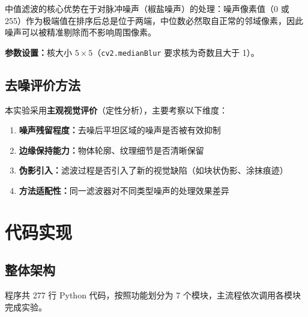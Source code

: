 \documentclass[12pt,a4paper]{ctexart}
\begin{document}
中值滤波的核心优势在于对脉冲噪声（椒盐噪声）的处理：噪声像素值（0 或 255）作为极端值在排序后总是位于两端，中位数必然取自正常的邻域像素，因此噪声可以被精准剔除而不影响周围像素。

\textbf{参数设置：}核大小 $5\times5$（\texttt{cv2.medianBlur} 要求核为奇数且大于 1）。

\subsection{去噪评价方法}

本实验采用\textbf{主观视觉评价}（定性分析），主要考察以下维度：

\begin{enumerate}[leftmargin=*]
    \item \textbf{噪声残留程度：}去噪后平坦区域的噪声是否被有效抑制
    \item \textbf{边缘保持能力：}物体轮廓、纹理细节是否清晰保留
    \item \textbf{伪影引入：}滤波过程是否引入了新的视觉缺陷（如块状伪影、涂抹痕迹）
    \item \textbf{方法适配性：}同一滤波器对不同类型噪声的处理效果差异
\end{enumerate}

\newpage

\section{代码实现}

\subsection{整体架构}

程序共 277 行 Python 代码，按照功能划分为 7 个模块，主流程依次调用各模块完成实验。
\end{document}
